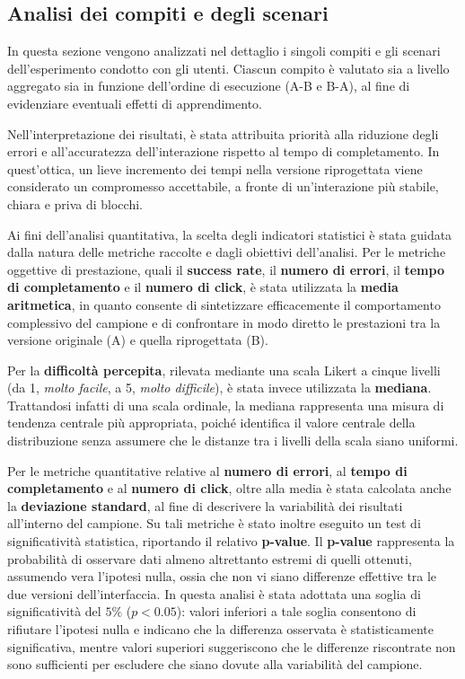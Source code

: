 \subsection{Analisi dei compiti e degli scenari}

In questa sezione vengono analizzati nel dettaglio i singoli compiti e gli scenari dell’esperimento condotto con gli utenti. Ciascun compito è valutato sia a livello aggregato sia in funzione dell’ordine di esecuzione (A-B e B-A), al fine di evidenziare eventuali effetti di apprendimento.

Nell’interpretazione dei risultati, è stata attribuita priorità alla riduzione degli errori e all’accuratezza dell’interazione rispetto al tempo di completamento. In quest’ottica, un lieve incremento dei tempi nella versione riprogettata viene considerato un compromesso accettabile, a fronte di un’interazione più stabile, chiara e priva di blocchi.

Ai fini dell’analisi quantitativa, la scelta degli indicatori statistici è stata guidata dalla natura delle metriche raccolte e dagli obiettivi dell’analisi. Per le metriche oggettive di prestazione, quali il \textbf{success rate}, il \textbf{numero di errori}, il \textbf{tempo di completamento} e il \textbf{numero di click}, è stata utilizzata la \textbf{media aritmetica}, in quanto consente di sintetizzare efficacemente il comportamento complessivo del campione e di confrontare in modo diretto le prestazioni tra la versione originale (A) e quella riprogettata (B).

Per la \textbf{difficoltà percepita}, rilevata mediante una scala Likert a cinque livelli (da 1, \textit{molto facile}, a 5, \textit{molto difficile}), è stata invece utilizzata la \textbf{mediana}. Trattandosi infatti di una scala ordinale, la mediana rappresenta una misura di tendenza centrale più appropriata, poiché identifica il valore centrale della distribuzione senza assumere che le distanze tra i livelli della scala siano uniformi.

Per le metriche quantitative relative al \textbf{numero di errori}, al \textbf{tempo di completamento} e al \textbf{numero di click}, oltre alla media è stata calcolata anche la \textbf{deviazione standard}, al fine di descrivere la variabilità dei risultati all'interno del campione. Su tali metriche è stato inoltre eseguito un test di significatività statistica, riportando il relativo \textbf{p-value}. Il \textbf{p-value} rappresenta la probabilità di osservare dati almeno altrettanto estremi di quelli ottenuti, assumendo vera l'ipotesi nulla, ossia che non vi siano differenze effettive tra le due versioni dell'interfaccia. In questa analisi è stata adottata una soglia di significatività del $5\%$ ($p < 0.05$): valori inferiori a tale soglia consentono di rifiutare l'ipotesi nulla e indicano che la differenza osservata è statisticamente significativa, mentre valori superiori suggeriscono che le differenze riscontrate non sono sufficienti per escludere che siano dovute alla variabilità del campione.

